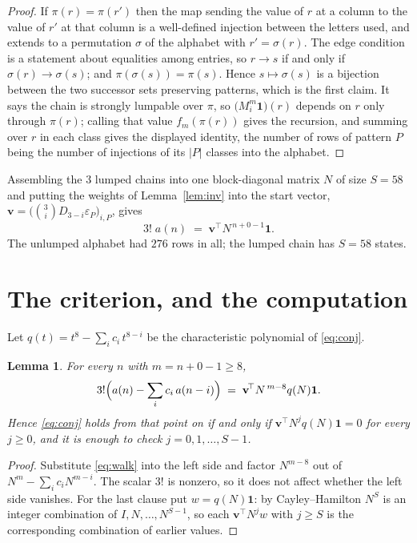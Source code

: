 \documentclass[11pt,a4paper]{article}
\theoremstyle{plain}
\newtheorem{lemma}[theorem]{Lemma}
\theoremstyle{definition}
\begin{document}
\begin{proof}
If $\pi(r)=\pi(r')$ then the map sending the value of $r$ at a column to the value of $r'$
at that column is a well-defined injection between the letters used, and extends to a
permutation $\sigma$ of the alphabet with $r'=\sigma(r)$. The edge condition is a statement
about equalities among entries, so $r\to s$ if and only if $\sigma(r)\to\sigma(s)$; and
$\pi(\sigma(s))=\pi(s)$. Hence $s\mapsto\sigma(s)$ is a bijection between the two successor
sets preserving patterns, which is the first claim. It says the chain is strongly lumpable
over $\pi$, so $\bigl(M_i^{m}\mathbf{1}\bigr)(r)$ depends on $r$ only through $\pi(r)$;
calling that value $f_m(\pi(r))$ gives the recursion, and summing over $r$ in each class
gives the displayed identity, the number of rows of pattern $P$ being the number of
injections of its $|P|$ classes into the alphabet.
\end{proof}

Assembling the $3$ lumped chains into one block-diagonal matrix $N$ of size $S=58$ and
putting the weights of Lemma~\ref{lem:inv} into the start vector,
$\mathbf{v}=\bigl(\binom{3}{i}D_{3-i}\varepsilon_P\bigr)_{i,P}$, gives
\begin{equation}\label{eq:walk}
3!\;a(n)\;=\;\mathbf{v}^{\!\top}N^{\,n+0-1}\mathbf{1} .
\end{equation}
The unlumped alphabet had $276$ rows in all; the lumped chain has $S=58$ states.

\section{The criterion, and the computation}

Let $q(t)=t^{8}-\sum_i c_i\,t^{8-i}$ be the characteristic polynomial of
\eqref{eq:conj}.

\begin{lemma}\label{lem:crit}
For every $n$ with $m=n+0-1\ge8$,
\[
3!\Bigl(a(n)-\sum_i c_i\,a(n-i)\Bigr)\;=\;\mathbf{v}^{\!\top}N^{\,m-8}q(N)\mathbf{1} .
\]
Hence \eqref{eq:conj} holds from that point on if and only if
$\mathbf{v}^{\!\top}N^{j}q(N)\mathbf{1}=0$ for every $j\ge0$, and it is enough to check
$j=0,1,\dots,S-1$.
\end{lemma}

\begin{proof}
Substitute \eqref{eq:walk} into the left side and factor $N^{m-8}$ out of
$N^{m}-\sum_i c_iN^{m-i}$. The scalar $3!$ is nonzero, so it does not affect whether
the left side vanishes. For the last clause put $w=q(N)\mathbf{1}$: by Cayley--Hamilton
$N^{S}$ is an integer combination of $I,N,\dots,N^{S-1}$, so each
$\mathbf{v}^{\!\top}N^{j}w$ with $j\ge S$ is the corresponding combination of earlier
values.
\end{proof}
\end{document}
